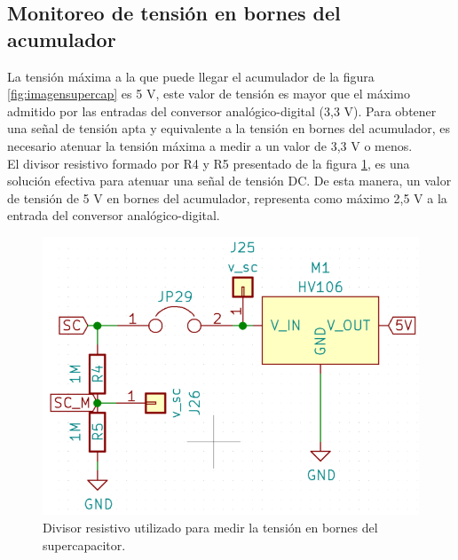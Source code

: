 \subsection{Monitoreo de tensión en bornes del acumulador}
La tensión máxima a la que puede llegar el acumulador de la figura \ref{fig:imagensupercap} es 5 V, este valor de tensión es mayor que el máximo admitido por las entradas del conversor analógico-digital (3,3 V). Para obtener una señal de tensión apta y equivalente a la tensión en bornes del acumulador, es necesario atenuar la tensión máxima a medir a un valor de 3,3 V o menos.\\
El divisor resistivo formado por R4 y R5 presentado de la figura \ref{fig:ctodivisorresistivo}, es una solución efectiva para atenuar una señal de tensión DC. De esta manera, un valor de tensión de 5 V en bornes del acumulador, representa como máximo 2,5 V a la entrada del conversor analógico-digital.\\
\begin{figure}[h!]
	\centering
	\includegraphics[width=0.6\linewidth]{Figures/cto_divisor_resistivo}
	\caption{Divisor resistivo utilizado para medir la tensión en bornes del supercapacitor.}
	\label{fig:ctodivisorresistivo}
\end{figure}

